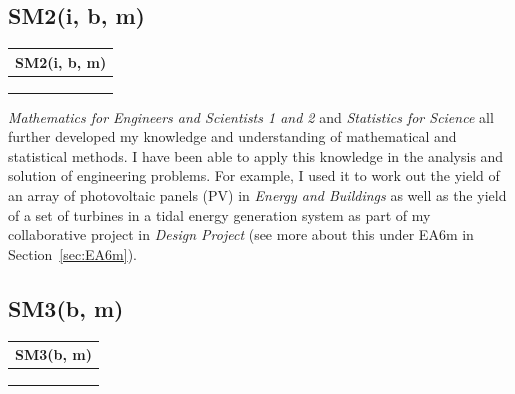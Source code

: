 \subsection*{SM2(i, b, m)}

\begin{table}
	\begin{tabular}{|ll|}
		\hline
		\multicolumn{2}{|c|}{\cellcolor[HTML]{F8A102}\textbf{SM2(i, b, m) \nomaster}} \\ \hline
		\MESOne & \MESTwo \\
		\EnvBeh & \Stats \\
		\TPS & \LAB \\ \hline
	\end{tabular}
\end{table}

\textit{Mathematics for Engineers and Scientists 1 and 2} and \textit{Statistics for Science} all further developed my knowledge and understanding of mathematical and statistical methods.
I have been able to apply this knowledge in the analysis and solution of engineering problems.
For example, I used it to work out the yield of an array of photovoltaic panels (PV) in \textit{Energy and Buildings} as well as the yield of a set of turbines in a tidal energy generation system as part of my collaborative project in \textit{Design Project} (see more about this under EA6m in Section~\ref{sec:EA6m}).








\subsection*{SM3(b, m)}

\begin{table}
	\begin{tabular}{|ll|}
		\hline
		\multicolumn{2}{|c|}{\cellcolor[HTML]{F8A102}\textbf{SM3(b, m) \nomaster}} \\ \hline
		\ConTechOne & \MechB \\
		\ConTechTwo & \HYD \\
		\LAB &  \\ \hline
	\end{tabular}
\end{table}


